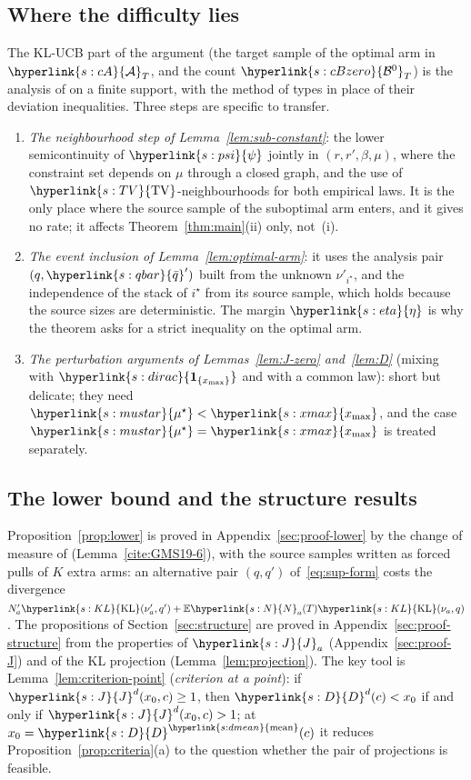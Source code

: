 \documentclass[11pt]{article}
\newcommand{\E}{\mathbb{E}}
\newcommand{\sy}[2]{{\hyperlink{#1}{#2}}}
\newcommand{\xmax}{\sy{s:xmax}{x_{\max}}}
\newcommand{\KL}{\sy{s:KL}{\mathrm{KL}}}
\newcommand{\TV}{\sy{s:TV}{\mathrm{TV}}}
\newcommand{\dirac}{\sy{s:dirac}{\mathbf{1}_{\{x_{\max}\}}}}
\newcommand{\dmean}{\sy{s:dmean}{\mathrm{mean}}}
\newcommand{\mus}{\sy{s:mustar}{\mu^{\star}}}
\newcommand{\Nc}{\sy{s:N}{N}}
\newcommand{\Jf}{\sy{s:J}{J}}
\newcommand{\Dc}{\sy{s:D}{D}}
\newcommand{\etam}{\sy{s:eta}{\eta}}
\newcommand{\cA}{\sy{s:cA}{\mathcal{A}}}
\newcommand{\cBz}{\sy{s:cBzero}{\mathcal{B}^{0}}}
\newcommand{\psif}{\sy{s:psi}{\psi}}
\newcommand{\qbar}{\sy{s:qbar}{\bar q}}
\begin{document}
\subsection{Where the difficulty lies}\label{sec:weak}

The KL-UCB part of the argument (the target sample of the optimal arm in $\cA_T$, and the count
$\cBz_T$) is the analysis of \citet{CGMMS13} on a finite support, with the method of types in place
of their deviation inequalities. Three steps are specific to transfer.
\begin{enumerate}
\item \emph{The neighbourhood step of Lemma~\ref{lem:sub-constant}}: the lower semicontinuity of
  $\psif$ jointly in $(r,r',\beta,\mu)$, where the constraint set depends on $\mu$ through a closed
  graph, and the use of $\TV$-neighbourhoods for both empirical laws. It is the only place where the
  source sample of the suboptimal arm enters, and it gives no rate; it affects
  Theorem~\ref{thm:main}(ii) only, not~(i).
\item \emph{The event inclusion of Lemma~\ref{lem:optimal-arm}}: it uses the analysis pair
  $(q,\qbar')$ built from the unknown $\nu'_{i^\star}$, and the independence of the stack of
  $i^\star$ from its source sample, which holds because the source sizes are deterministic. The
  margin $\etam$ is why the theorem asks for a strict inequality on the optimal arm.
\item \emph{The perturbation arguments of Lemmas~\ref{lem:J-zero} and~\ref{lem:D}} (mixing with
  $\dirac$ and with a common law): short but delicate; they need $\mus<\xmax$, and the case
  $\mus=\xmax$ is treated separately.
\end{enumerate}

\subsection{The lower bound and the structure results}

Proposition~\ref{prop:lower} is proved in Appendix~\ref{sec:proof-lower} by the change of measure of
\citet[(6)]{GMS19} (Lemma~\ref{cite:GMS19-6}), with the source samples written as forced pulls of
$K$ extra arms: an alternative pair $(q,q')$ of~\eqref{eq:sup-form} costs the divergence
$N'_a\KL(\nu'_a,q')+\E \Nc_a(T)\KL(\nu_a,q)$. The propositions of Section~\ref{sec:structure} are
proved in Appendix~\ref{sec:proof-structure} from the properties of $\Jf_a$
(Appendix~\ref{sec:proof-J}) and of the KL projection (Lemma~\ref{lem:projection}). The key tool is
Lemma~\ref{lem:criterion-point} (\emph{criterion at a point}): if $\Jf^d(x_0,c)\ge1$, then
$\Dc^d(c)<x_0$ if and only if $\Jf^d(x_0,c)>1$; at $x_0=\Dc^{\dmean}(c)$ it reduces
Proposition~\ref{prop:criteria}(a) to the question whether the pair of projections is feasible.
\end{document}
